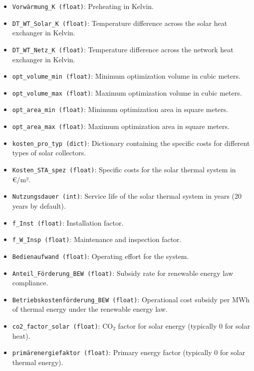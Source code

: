 \begin{itemize}
    \item \texttt{Vorwärmung\_K (float)}: Preheating in Kelvin.
    \item \texttt{DT\_WT\_Solar\_K (float)}: Temperature difference across the solar heat exchanger in Kelvin.
    \item \texttt{DT\_WT\_Netz\_K (float)}: Temperature difference across the network heat exchanger in Kelvin.
    \item \texttt{opt\_volume\_min (float)}: Minimum optimization volume in cubic meters.
    \item \texttt{opt\_volume\_max (float)}: Maximum optimization volume in cubic meters.
    \item \texttt{opt\_area\_min (float)}: Minimum optimization area in square meters.
    \item \texttt{opt\_area\_max (float)}: Maximum optimization area in square meters.
    \item \texttt{kosten\_pro\_typ (dict)}: Dictionary containing the specific costs for different types of solar collectors.
    \item \texttt{Kosten\_STA\_spez (float)}: Specific costs for the solar thermal system in €/m².
    \item \texttt{Nutzungsdauer (int)}: Service life of the solar thermal system in years (20 years by default).
    \item \texttt{f\_Inst (float)}: Installation factor.
    \item \texttt{f\_W\_Insp (float)}: Maintenance and inspection factor.
    \item \texttt{Bedienaufwand (float)}: Operating effort for the system.
    \item \texttt{Anteil\_Förderung\_BEW (float)}: Subsidy rate for renewable energy law compliance.
    \item \texttt{Betriebskostenförderung\_BEW (float)}: Operational cost subsidy per MWh of thermal energy under the renewable energy law.
    \item \texttt{co2\_factor\_solar (float)}: CO$_2$ factor for solar energy (typically 0 for solar heat).
    \item \texttt{primärenergiefaktor (float)}: Primary energy factor (typically 0 for solar thermal energy).
\end{itemize}

